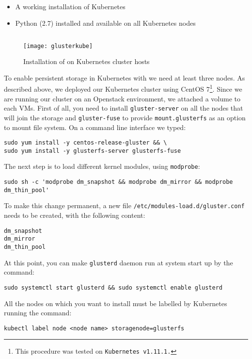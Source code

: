 \begin{itemize}
\item A working installation of Kubernetes
\item Python (2.7) installed and available on all Kubernetes nodes
\end{itemize}

\subsection{\gluster{}}
\label{glusterfs}

\begin{figure}[htbp]
\centering
\texttt{[image: glusterkube]}
\caption{Installation of \gluster{} on Kubernetes cluster hosts}
\end{figure}

To enable persistent storage in Kubernetes with \gluster{} we need at least
three nodes. As described above, we deployed our Kubernetes cluster using CentOS
7\footnote{This procedure was tested on \texttt{Kubernetes\ v1.11.1.}}. Since we
are running our cluster on an Openstack environment, we attached a volume to
each VMs. First of all, you need to install \texttt{gluster-server} on all the
nodes that will join the storage and \texttt{gluster-fuse} to provide
\texttt{mount.glusterfs} as an option to mount \gluster{} file system. On a
command line interface we typed:
\begin{lstlisting}
sudo yum install -y centos-release-gluster && \
sudo yum install -y glusterfs-server glusterfs-fuse
\end{lstlisting}
The next step is to load different kernel modules, using \texttt{modprobe}:
\begin{lstlisting}
sudo sh -c 'modprobe dm_snapshot && modprobe dm_mirror && modprobe dm_thin_pool'
\end{lstlisting}
To make this change permanent, a new file
\texttt{/etc/modules-load.d/gluster.conf} needs to be created, with the
following content:
\begin{lstlisting}
dm_snapshot
dm_mirror
dm_thin_pool
\end{lstlisting}
At this point, you can make \texttt{glusterd} daemon run at system start up by
the command:
\begin{lstlisting}
sudo systemctl start glusterd && sudo systemctl enable glusterd
\end{lstlisting}
All the nodes on which you want to install \gluster{} must be labelled by
Kubernetes running the command:
\begin{lstlisting}
kubectl label node <node name> storagenode=glusterfs
\end{lstlisting}
